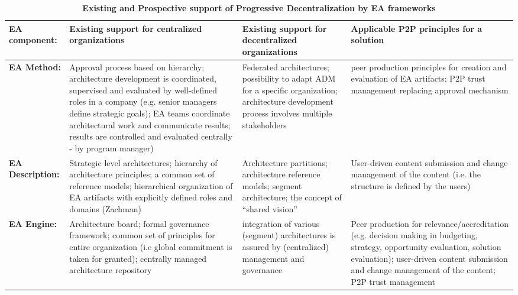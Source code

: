\begin{table*}
\caption{\textbf{ Existing and Prospective support of Progressive Decentralization by EA frameworks}}
\label{summary}
\begin{tabular}{ | l | p{}| p{} | p{}|}
%
\hline
%
EA component: & 
\textbf{Existing support for centralized organizations} &
\textbf{Existing support for decentralized organizations} &  
\textbf{Applicable P2P principles for a solution} \\
%
\hline
%
\textbf{EA Method:} & 
Approval process based on hierarchy; architecture development is coordinated, supervised and evaluated by well-defined roles in a company (e.g. senior managers define strategic goals); EA teams coordinate architectural work and communicate results; results are controlled and evaluated centrally - by program manager) &
Federated architectures; possibility to adapt ADM for a specific organization; architecture development process involves multiple stakeholders & 
peer production principles for creation and evaluation of EA artifacts; P2P trust management replacing approval mechanism\\
%
\hline
%
\textbf{EA Description:} & 
Strategic level architectures; hierarchy of architecture principles; a common set of reference models; hierarchical organization of EA artifacts with explicitly defined roles and domains (Zachman) &
Architecture partitions; architecture reference models; segment architecture; the concept of ``shared vision'' & 
User-driven content submission and change management of the content (i.e. the structure is defined by the users)\\
%
\hline
%
%
\textbf{EA Engine:} &
Architecture board; formal governance framework; common set of principles for entire organization (i.e global commitment is taken for granted); centrally managed architecture repository &
integration of various (segment) architectures is assured by (centralized) management and governance &
Peer production for relevance/accreditation (e.g. decision making in budgeting, strategy, opportunity evaluation, solution evaluation); user-driven content submission and change management of the content; P2P trust management\\
%
\hline
%
\end{tabular}
\end{table*}
